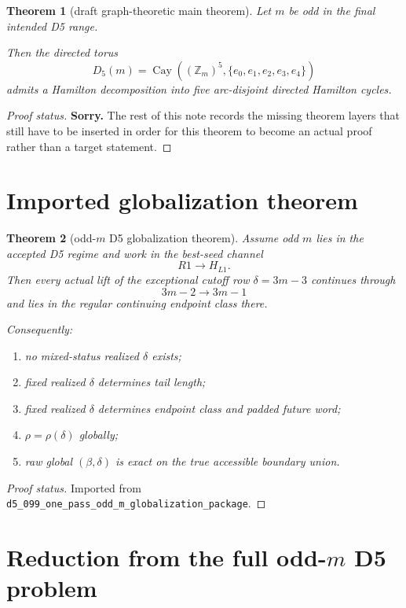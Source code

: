 \documentclass[11pt]{article}
\newtheorem{theorem}{Theorem}[section]
\newcommand{\Z}{\mathbb Z}
\begin{document}
\begin{theorem}[draft graph-theoretic main theorem]
Let $m$ be odd in the final intended D5 range.

Then the directed torus
\[
D_5(m)=\operatorname{Cay}((\Z_m)^5,\{e_0,e_1,e_2,e_3,e_4\})
\]
admits a Hamilton decomposition into five arc-disjoint directed Hamilton
cycles.
\end{theorem}

\begin{proof}[Proof status]
\textbf{Sorry.} The rest of this note records the missing theorem layers that
still have to be inserted in order for this theorem to become an actual proof
rather than a target statement.
\end{proof}

\section{Imported globalization theorem}

\begin{theorem}[odd-$m$ D5 globalization theorem]
Assume odd $m$ lies in the accepted D5 regime and work in the best-seed channel
\[
R1 \to H_{L1}.
\]
Then every actual lift of the exceptional cutoff row $\delta=3m-3$ continues
through
\[
3m-2 \to 3m-1
\]
and lies in the regular continuing endpoint class there.

Consequently:
\begin{enumerate}[label=\textup{(\arabic*)},leftmargin=2.5em]
\item no mixed-status realized $\delta$ exists;
\item fixed realized $\delta$ determines tail length;
\item fixed realized $\delta$ determines endpoint class and padded future word;
\item $\rho=\rho(\delta)$ globally;
\item raw global $(\beta,\delta)$ is exact on the true accessible boundary
      union.
\end{enumerate}
\end{theorem}

\begin{proof}[Proof status]
Imported from
\texttt{d5\_099\_one\_pass\_odd\_m\_globalization\_package}.
\end{proof}

\section{Reduction from the full odd-$m$ D5 problem}
\end{document}
